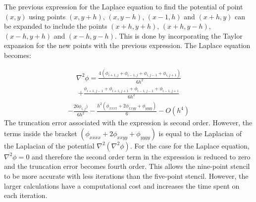 The previous expression for the Laplace equation to find the potential of point $(x,y)$ using points $(x,y+h)$, $(x,y-h)$, $(x-1,h)$ and $(x+h,y)$ can be expanded to include the points $(x+h,y+h)$, $(x+h,y-h)$, $(x-h,y+h)$ and $(x-h,y-h)$. This is done by incorporating the Taylor expansion for the new points with the previous expression. The Laplace equation becomes:

\begin{align*}
\nabla ^2 \phi = \frac{4(\phi_{i+1,j} + \phi_{i-1,j} + \phi_{i,j-1} + \phi_{i,j+1})}{6h^2}
\end{align*}
\begin{align*}
+ \frac{\phi_{i+1,j-1} + \phi_{i+1,j+1} + \phi_{i-1,j-1} + \phi_{i-1,j+1}}{6h^2}
\end{align*}
\begin{align}
- \frac{20\phi_{i,j})}{6h^2} - \frac{h^2(\phi_{xxxx} + 2 \phi_{xxyy} + \phi_{yyyy})}{6} - O(h^4)
\end{align}
The truncation error associated with the expression is second order. However, the terms inside the bracket $(\phi_{xxxx} + 2 \phi_{xxyy} + \phi_{yyyy})$ is equal to the Laplacian of the Laplacian of the potential $\nabla^2 (\nabla ^2 \phi)$. For the case for the Laplace equation, $\nabla ^2 \phi = 0$ and therefore the second order term in the expression is reduced to zero and the truncation error becomes fourth order. This allows the nine-point stencil to be more accurate with less iterations than the five-point stencil. However, the larger calculations have a computational cost and increases the time spent on each iteration.
